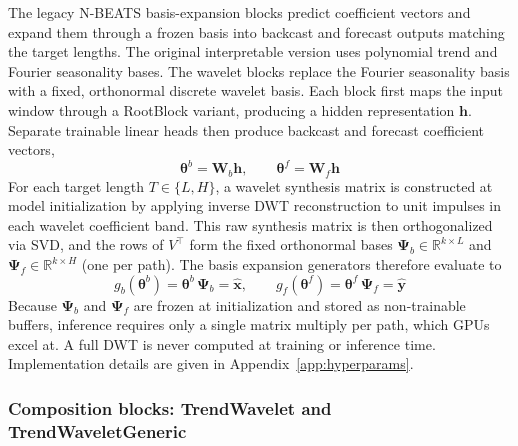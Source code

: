 \documentclass{article}
\begin{document}
The legacy N-BEATS basis-expansion blocks predict coefficient vectors and expand them through a frozen basis into backcast and forecast outputs matching the target lengths. The original interpretable version uses polynomial trend and Fourier seasonality bases. The wavelet blocks replace the Fourier seasonality basis with a fixed, orthonormal discrete wavelet basis. Each block first maps the input window through a RootBlock variant, producing a hidden representation $\mathbf{h}$. Separate trainable linear heads then produce backcast and forecast coefficient vectors,
\begin{equation*}
\boldsymbol{\theta}^b = \mathbf{W}_b\mathbf{h},\qquad \boldsymbol{\theta}^f = \mathbf{W}_f\mathbf{h}
\end{equation*}
For each target length $T \in \{L, H\}$, a wavelet synthesis matrix is constructed at model initialization by applying inverse DWT reconstruction to unit impulses in each wavelet coefficient band. This raw synthesis matrix is then orthogonalized via SVD, and the rows of $V^\top$ form the fixed orthonormal bases $\boldsymbol{\Psi}_b \in \mathbb{R}^{k \times L}$ and $\boldsymbol{\Psi}_f \in \mathbb{R}^{k \times H}$ (one per path). The basis expansion generators therefore evaluate to
\begin{equation*}
g_b(\boldsymbol{\theta}^b) = \boldsymbol{\theta}^b\,\boldsymbol{\Psi}_b = \hat{\mathbf{x}}, \qquad g_f(\boldsymbol{\theta}^f) = \boldsymbol{\theta}^f\,\boldsymbol{\Psi}_f = \hat{\mathbf{y}}
\end{equation*}
Because $\boldsymbol{\Psi}_b$ and $\boldsymbol{\Psi}_f$ are frozen at initialization and stored as non-trainable buffers, inference requires only a single matrix multiply per path, which GPUs excel at. A full DWT is never computed at training or inference time. Implementation details are given in Appendix~\ref{app:hyperparams}.

\subsubsection{Composition blocks: TrendWavelet and TrendWaveletGeneric}
\end{document}

